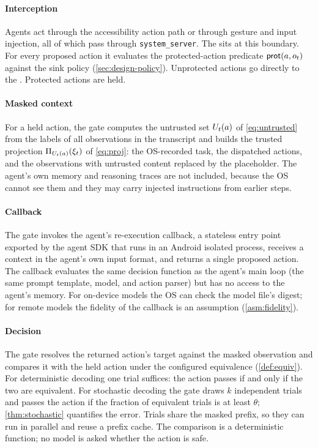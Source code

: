 \paragraph{Interception} Agents act through the accessibility action path or through gesture and input injection, all of which pass through \texttt{system\_server}. The \CG{} sits at this boundary. For every proposed action it evaluates the protected-action predicate $\mathsf{prot}(a,o_t)$ against the sink policy (\cref{sec:design-policy}). Unprotected actions go directly to the \DB{}. Protected actions are held.

\paragraph{Masked context} For a held action, the gate computes the untrusted set $U_t(a)$ of \cref{eq:untrusted} from the labels of all observations in the transcript and builds the trusted projection $\Pi_{U_t(a)}(\xi_t)$ of \cref{eq:proj}: the OS-recorded task, the dispatched actions, and the observations with untrusted content replaced by the placeholder. The agent's own memory and reasoning traces are not included, because the OS cannot see them and they may carry injected instructions from earlier steps.

\paragraph{Callback} The gate invokes the agent's re-execution callback, a stateless entry point exported by the agent SDK that runs in an Android isolated process, receives a context in the agent's own input format, and returns a single proposed action. The callback evaluates the same decision function as the agent's main loop (the same prompt template, model, and action parser) but has no access to the agent's memory. For on-device models the OS can check the model file's digest; for remote models the fidelity of the callback is an assumption (\cref{asm:fidelity}).

\paragraph{Decision} The gate resolves the returned action's target against the masked observation and compares it with the held action under the configured equivalence (\cref{def:equiv}). For deterministic decoding one trial suffices: the action passes if and only if the two are equivalent. For stochastic decoding the gate draws $k$ independent trials and passes the action if the fraction of equivalent trials is at least $\theta$; \cref{thm:stochastic} quantifies the error. Trials share the masked prefix, so they can run in parallel and reuse a prefix cache. The comparison is a deterministic function; no model is asked whether the action is safe.

